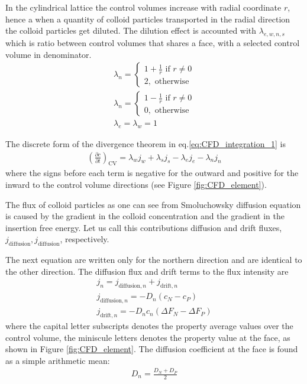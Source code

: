 \documentclass[10pt, a4paper]{article}
\begin{document}
\begin{multicols}{2}
In the cylindrical lattice the control volumes increase with radial coordinate $r$,
hence a when a quantity of colloid particles transported in the radial direction the colloid particles get diluted.
The dilution effect is accounted with $\lambda_{e,w,n,s}$ which is ratio between control volumes that shares a face, with a selected control volume in denominator.
\begin{eqnarray}
    \lambda_n =\begin{cases}
        1+\frac{1}{r} \textrm{ if } r \ne 0\\
        2, \textrm{ otherwise}
    \end{cases} 
    \\
    \lambda_n =\begin{cases}
        1-\frac{1}{r} \textrm{ if } r \ne 0\\
        0, \textrm{ otherwise}
    \end{cases} 
    \\
    \lambda_{e} = \lambda_{w} = 1
\end{eqnarray}

The discrete form of the divergence theorem in eq.\ref{eq:CFD_integration_1} is
\begin{eqnarray}
    \label{eq:CFD_integration_2}
    \left(\frac{\partial c}{\partial t}\right)_{\textrm{CV}} = \lambda_w j_w + \lambda_s j_s - \lambda_e j_e - \lambda_n j_n
\end{eqnarray}
where the signs before each term is negative for the outward and positive for the inward to the control volume directions (see Figure \ref{fig:CFD_element}).

The flux of colloid particles as one can see from Smoluchowsky diffusion equation is caused by the gradient in the colloid concentration and the gradient in the insertion free energy. 
Let us call this contributions diffusion and drift fluxes, $j_{\textrm{diffusion}}, j_{\textrm{diffusion}}$, respectively.

The next equation are written only for the northern direction and are identical to the other direction.
The diffusion flux and drift terms to the flux intensity are
\begin{eqnarray}
    j_n = j_{\textrm{diffusion}, n} + j_{\textrm{drift}, n}\\
    j_{\textrm{diffusion}, n} = - D_n (c_N - c_P)\\
    j_{\textrm{drift}, n} = - D_n c_n (\Delta F_N - \Delta F_P)
\end{eqnarray}
where the capital letter subscripts denotes the property average values over the control volume, the miniscule letters denotes the property value at the face, as shown in Figure \ref{fig:CFD_element}.
The diffusion coefficient at the face is found as a simple arithmetic mean:
\begin{eqnarray}
    D_n = \frac{D_N+D_P}{2}
\end{eqnarray}


\end{multicols}
\end{document}
